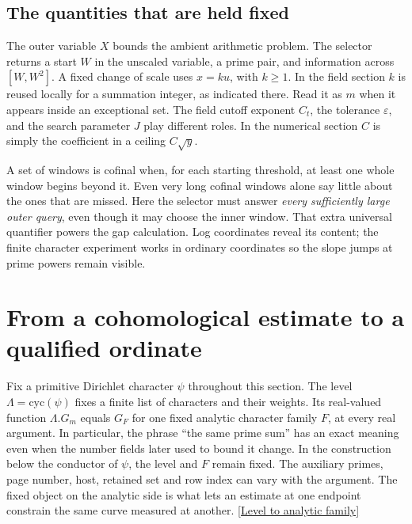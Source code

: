 \documentclass[12pt,letterpaper]{article}
\begin{document}
\subsection{The quantities that are held fixed}
The outer variable \(X\) bounds the ambient arithmetic problem. The selector returns a start \(W\) in the unscaled variable, a prime pair, and information across \([W,W^2]\). A fixed change of scale uses \(x=ku\), with \(k\ge1\). In the field section \(k\) is reused locally for a summation integer, as indicated there. Read it as \(m\) when it appears inside an exceptional set. The field cutoff exponent \(C_t\), the tolerance \(\varepsilon\), and the search parameter \(J\) play different roles. In the numerical section \(C\) is simply the coefficient in a ceiling \(C\sqrt y\).

A set of windows is cofinal when, for each starting threshold, at least one whole window begins beyond it. Even very long cofinal windows alone say little about the ones that are missed. Here the selector must answer \emph{every sufficiently large outer query}, even though it may choose the inner window. That extra universal quantifier powers the gap calculation. Log coordinates reveal its content; the finite character experiment works in ordinary coordinates so the slope jumps at prime powers remain visible.


\section{From a cohomological estimate to a qualified ordinate}
\label{sec:transport-raw}

Fix a primitive Dirichlet character \(\psi\) throughout this section. The level \(\Lambda=\mathrm{cyc}(\psi)\) fixes a finite list of characters and their weights. Its real-valued function \(\Lambda.G_m\) equals \(G_F\) for one fixed analytic character family \(F\), at every real argument. In particular, the phrase ``the same prime sum'' has an exact meaning even when the number fields later used to bound it change. In the construction below the conductor of \(\psi\), the level and \(F\) remain fixed. The auxiliary primes, page number, host, retained set and row index can vary with the argument. The fixed object on the analytic side is what lets an estimate at one endpoint constrain the same curve measured at another.
\href{https://github.com/nousentllc/riemann-hypothesis/blob/40e56bab026552e089d7afcfeff08d2defb9c005/src/Development/AutomorphicArithmetic/PrimitiveCosets/LevelFamily.lean#L27-L52}{[Level to analytic family]}
\end{document}
